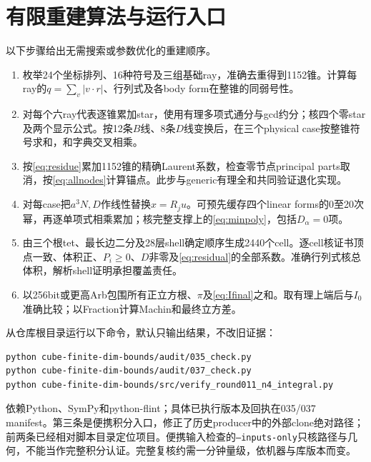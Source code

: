 \documentclass[UTF8,11pt,a4paper,fontset=fandol]{ctexart}
\theoremstyle{remark}\newtheorem{remark}[theorem]{注}
\newcommand{\1}{\mathbf1}\newcommand{\pos}[1]{(#1)_+}
\begin{document}
\appendix
\section{有限重建算法与运行入口}
以下步骤给出无需搜索或参数优化的重建顺序。
\begin{enumerate}
 \item 枚举24个坐标排列、16种符号及三组基础ray，准确去重得到1152锥。计算每ray的$q=\sum_v|v\cdot r|$、行列式及各body form在整锥的同弱号性。
 \item 对每个六ray代表逐锥累加star，使用有理多项式通分与gcd约分；核四个零star及两个显示公式。按12条$B$线、8条$D$线变换后，在三个physical case按整锥符号求和，和字典交叉相乘。
 \item 按\eqref{eq:residue}累加1152锥的精确Laurent系数，检查零节点principal parts取消，按\eqref{eq:allnodes}计算锚点。此步与generic有理全和共同验证退化实现。
 \item 对每case把$a^3N,D$作线性替换$x=R_ju$。可预先缓存四个linear forms的0至20次幂，再逐单项式相乘累加；核完整支撑上的\eqref{eq:minpoly}，包括$D_\alpha=0$项。
 \item 由三个根tet、最长边二分及28层shell确定顺序生成2440个cell。逐cell核证书顶点一致、体积正、$P_i\ge0$、$D$非零及\eqref{eq:residual}的全部系数。准确行列式核总体积，解析shell证明承担覆盖责任。
 \item 以256bit或更高Arb包围所有正立方根、$\pi$及\eqref{eq:Ifinal}之和。取有理上端后与$I_0$准确比较；以Fraction计算Machin和最终立方差。
\end{enumerate}
从仓库根目录运行以下命令，默认只输出结果，不改旧证据：
\begin{Verbatim}[fontsize=\small]
python cube-finite-dim-bounds/audit/035_check.py
python cube-finite-dim-bounds/audit/037_check.py
python cube-finite-dim-bounds/src/verify_round011_n4_integral.py
\end{Verbatim}
依赖Python、SymPy和python-flint；具体已执行版本及回执在035/037 manifest。第三条是便携积分入口，修正了历史producer中的外部clone绝对路径；前两条已经相对脚本目录定位项目。便携输入检查的\texttt{--inputs-only}只核路径与几何，不能当作完整积分认证。完整复核约需一分钟量级，依机器与库版本而变。
\end{document}
